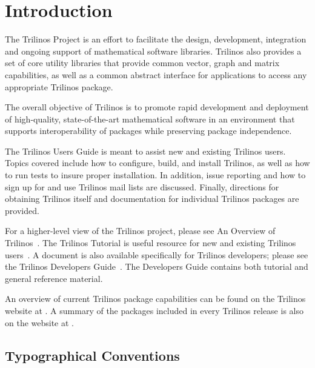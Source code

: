 \documentclass[12pt,relax]{TrilinosUserGuide}
\begin{document}
\section{Introduction}
\label{Section:Introduction}
The Trilinos Project is an effort to facilitate the design, development,
integration and ongoing support of mathematical software libraries.  Trilinos
also provides a set of core utility libraries
that provide common vector, graph and matrix capabilities, as well as
a common abstract interface for applications to access any appropriate
Trilinos package.

The overall objective of Trilinos is to promote rapid development and
deployment of high-quality, state-of-the-art mathematical software in
an environment that supports interoperability of packages while
preserving package independence.

The Trilinos Users Guide is meant to assist new and existing
Trilinos users.  Topics covered include how to configure, build, and install
Trilinos, as well as how to run tests to insure proper installation.  In
addition, issue reporting and how to sign up for and use Trilinos mail lists
are discussed.  Finally, directions for obtaining Trilinos itself and
documentation for individual Trilinos packages are provided.


For a higher-level view of the Trilinos project, please see An Overview
of Trilinos~\cite{Trilinos-Overview}.  The Trilinos Tutorial is useful
resource for new and existing Trilinos users~\cite{Trilinos-Tutorial}.  A
document is also available specifically for Trilinos developers; please see
the Trilinos Developers Guide~\cite{Trilinos-Dev-Guide}.  The Developers
Guide contains both tutorial and general reference material.

An overview of current Trilinos package capabilities can be found on the
Trilinos website at
.
A summary of the packages included in every Trilinos release is also on
the website at
.

\subsection{Typographical Conventions}
\end{document}
